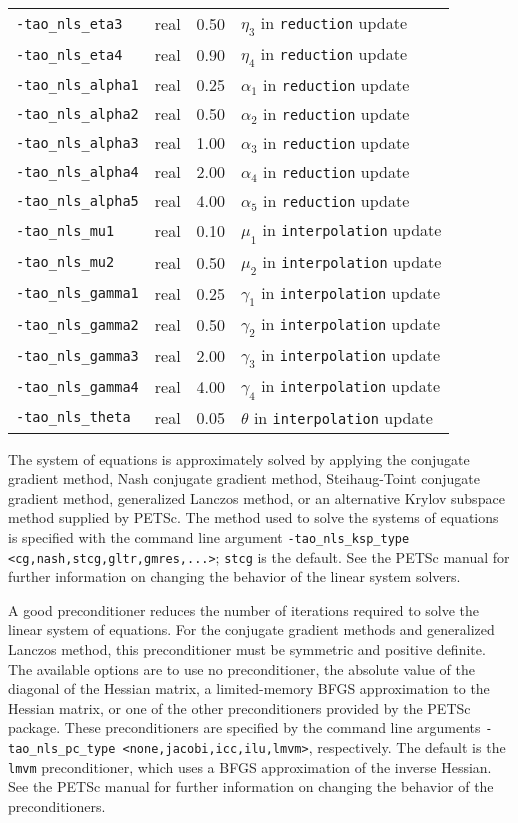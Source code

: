 \begin{table}[h]
\begin{tabular}{l|p{1.5in}|l|p{2.0in}}
{\tt -tao\_nls\_eta3} & real & 0.50 & $\eta_3$ in {\tt reduction} update \\
{\tt -tao\_nls\_eta4} & real & 0.90 & $\eta_4$ in {\tt reduction} update \\
{\tt -tao\_nls\_alpha1} & real & 0.25 & $\alpha_1$ in {\tt reduction} update \\
{\tt -tao\_nls\_alpha2} & real & 0.50 & $\alpha_2$ in {\tt reduction} update \\
{\tt -tao\_nls\_alpha3} & real & 1.00 & $\alpha_3$ in {\tt reduction} update \\
{\tt -tao\_nls\_alpha4} & real & 2.00 & $\alpha_4$ in {\tt reduction} update \\
{\tt -tao\_nls\_alpha5} & real & 4.00 & $\alpha_5$ in {\tt reduction} update \\
{\tt -tao\_nls\_mu1} & real & 0.10 & $\mu_1$ in {\tt interpolation} update \\
{\tt -tao\_nls\_mu2} & real & 0.50 & $\mu_2$ in {\tt interpolation} update \\
{\tt -tao\_nls\_gamma1} & real & 0.25 & $\gamma_1$ in {\tt interpolation} update \\
{\tt -tao\_nls\_gamma2} & real & 0.50 & $\gamma_2$ in {\tt interpolation} update \\
{\tt -tao\_nls\_gamma3} & real & 2.00 & $\gamma_3$ in {\tt interpolation} update \\
{\tt -tao\_nls\_gamma4} & real & 4.00 & $\gamma_4$ in {\tt interpolation} update \\
{\tt -tao\_nls\_theta} & real & 0.05 & $\theta$ in {\tt interpolation} update \\
\hline
\end{tabular}
\end{table}
\afterpage{\clearpage}

The system of equations is approximately solved by applying the conjugate 
gradient method, Nash conjugate gradient method, Steihaug-Toint conjugate 
gradient method, generalized 
Lanczos method, or an alternative Krylov subspace method 
supplied by PETSc.  The method used to solve the systems of equations is 
specified with the command line argument 
{\tt -tao\_nls\_ksp\_type <cg,nash,stcg,gltr,gmres,...>}; {\tt stcg} 
is the default. See the PETSc manual for further information on changing 
the behavior of the linear system solvers.  

A good preconditioner reduces the number of iterations required to
solve the linear system of equations.  For the conjugate gradient
methods and generalized Lanczos method, this preconditioner must be
symmetric and positive definite.  The available options are to use no
preconditioner, the absolute value of the diagonal of the Hessian
matrix, a limited-memory BFGS approximation to the Hessian matrix, or
one of the other preconditioners provided by the PETSc package.  These
preconditioners are specified by the command line arguments 
{\tt -tao\_nls\_pc\_type <none,jacobi,icc,ilu,lmvm>}, respectively. The
default is the {\tt lmvm} preconditioner, which uses a BFGS approximation 
of the inverse Hessian. See the PETSc manual for further information on 
changing the behavior of the preconditioners.

